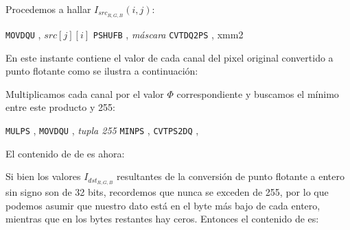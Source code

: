 Procedemos a hallar $I_{src_{R,G,B}}(i, j)$:

\begin{algorithmic}
    \STATE \texttt{MOVDQU} ,   $src[j][i]$      
    \STATE \texttt{PSHUFB} ,   \textit{máscara} 
    \STATE \texttt{CVTDQ2PS} , xmm{2}           
\end{algorithmic}

En este instante  contiene el valor de cada canal del pixel original
convertido a punto flotante como se ilustra a continuación:

\begin{center}
\end{center}

Multiplicamos cada canal por el valor $\Phi$ correspondiente y buscamos
el mínimo entre este producto y 255:

\begin{algorithmic}
    \STATE \texttt{MULPS}    ,  
    \STATE \texttt{MOVDQU}   , \textit{tupla 255}
    \STATE \texttt{MINPS}    , 
    \STATE \texttt{CVTPS2DQ} ,  
\end{algorithmic}

El contenido de de  es ahora:

\begin{center}
\end{center}

Si bien los valores $I_{dst_{R,G,B}}$ resultantes de la conversión de punto flotante a
entero sin signo son de 32 bits, recordemos que nunca se exceden de 255, por lo que podemos
asumir que nuestro dato está en el byte más bajo de cada entero, mientras que en los bytes
restantes hay ceros. Entonces el contenido de  es:

